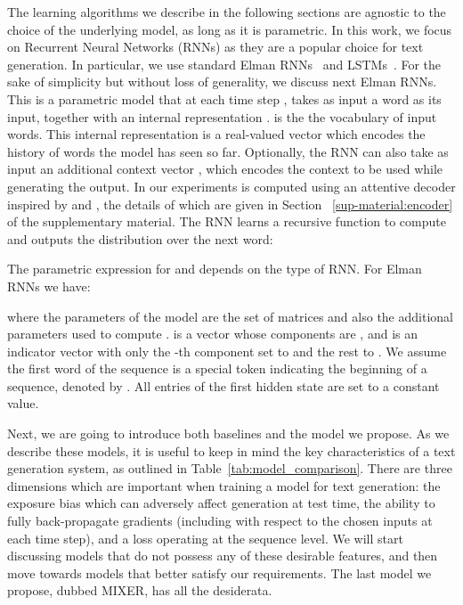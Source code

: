 \documentclass{article} \usepackage{iclr2016_conference,times}
\begin{document}
The learning algorithms we describe in the following sections are agnostic to
the choice of the underlying model, as long as it is parametric. 
In this work, we focus on Recurrent Neural Networks (RNNs) as they are a popular choice for text generation. In particular, we use standard Elman RNNs~\citep{elman1990} and LSTMs~\citep{lstm}. For the sake of simplicity but without loss of generality, we discuss next Elman RNNs. This is a parametric 
model that at each time step , takes as input a word  as its input, together 
with an internal representation .  is the the vocabulary of input words. 
This internal representation  is a real-valued vector which encodes the history of 
words the model has seen so far. 
Optionally, the RNN can also take as input an  additional context vector , which 
encodes the context to be used while generating the output. 
In our experiments  is computed using an attentive decoder 
inspired by \cite{bahdanau-iclr2015} and \citet{rush-2015}, the details of which 
are given in Section ~\ref{sup-material:encoder} of the supplementary material. 
The RNN learns a recursive function to compute  and 
outputs the distribution over the next word:

The parametric expression for  and  depends 
on the type of RNN. For Elman RNNs we have:

where the parameters of the model  are the set of matrices  
and also the additional parameters used to compute .  is a vector whose components are , and  is an indicator vector with only the -th component set to  and the rest to . We assume the first word of the sequence is a special token indicating the beginning of a sequence, denoted by . All entries of the first hidden state  are set to a constant value.

Next, we are going to introduce both baselines and the model we propose. As we describe these models, it is useful to keep in mind the key characteristics of a text generation system, as outlined in Table~\ref{tab:model_comparison}. There are three dimensions which are important when training a model for text generation: the exposure bias which can adversely affect generation at test time, the ability to fully back-propagate gradients (including with respect to the chosen inputs at each time step), and a loss operating at the sequence level. 
 We will start discussing models that do not possess any of these desirable features, and then move towards models that better satisfy our requirements. The last model we propose, dubbed MIXER, has all the desiderata.
\end{document}
